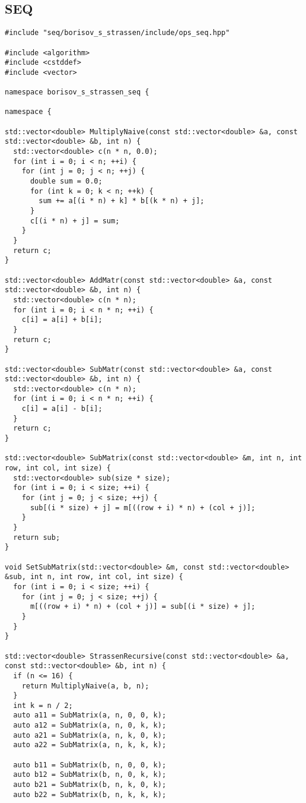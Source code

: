 \documentclass[12pt]{article}
\begin{document}
\subsection*{SEQ}
\begin{lstlisting}
#include "seq/borisov_s_strassen/include/ops_seq.hpp"

#include <algorithm>
#include <cstddef>
#include <vector>

namespace borisov_s_strassen_seq {

namespace {

std::vector<double> MultiplyNaive(const std::vector<double> &a, const std::vector<double> &b, int n) {
  std::vector<double> c(n * n, 0.0);
  for (int i = 0; i < n; ++i) {
    for (int j = 0; j < n; ++j) {
      double sum = 0.0;
      for (int k = 0; k < n; ++k) {
        sum += a[(i * n) + k] * b[(k * n) + j];
      }
      c[(i * n) + j] = sum;
    }
  }
  return c;
}

std::vector<double> AddMatr(const std::vector<double> &a, const std::vector<double> &b, int n) {
  std::vector<double> c(n * n);
  for (int i = 0; i < n * n; ++i) {
    c[i] = a[i] + b[i];
  }
  return c;
}

std::vector<double> SubMatr(const std::vector<double> &a, const std::vector<double> &b, int n) {
  std::vector<double> c(n * n);
  for (int i = 0; i < n * n; ++i) {
    c[i] = a[i] - b[i];
  }
  return c;
}

std::vector<double> SubMatrix(const std::vector<double> &m, int n, int row, int col, int size) {
  std::vector<double> sub(size * size);
  for (int i = 0; i < size; ++i) {
    for (int j = 0; j < size; ++j) {
      sub[(i * size) + j] = m[((row + i) * n) + (col + j)];
    }
  }
  return sub;
}

void SetSubMatrix(std::vector<double> &m, const std::vector<double> &sub, int n, int row, int col, int size) {
  for (int i = 0; i < size; ++i) {
    for (int j = 0; j < size; ++j) {
      m[((row + i) * n) + (col + j)] = sub[(i * size) + j];
    }
  }
}

std::vector<double> StrassenRecursive(const std::vector<double> &a, const std::vector<double> &b, int n) {
  if (n <= 16) {
    return MultiplyNaive(a, b, n);
  }
  int k = n / 2;
  auto a11 = SubMatrix(a, n, 0, 0, k);
  auto a12 = SubMatrix(a, n, 0, k, k);
  auto a21 = SubMatrix(a, n, k, 0, k);
  auto a22 = SubMatrix(a, n, k, k, k);

  auto b11 = SubMatrix(b, n, 0, 0, k);
  auto b12 = SubMatrix(b, n, 0, k, k);
  auto b21 = SubMatrix(b, n, k, 0, k);
  auto b22 = SubMatrix(b, n, k, k, k);


\end{lstlisting}
\end{document}
